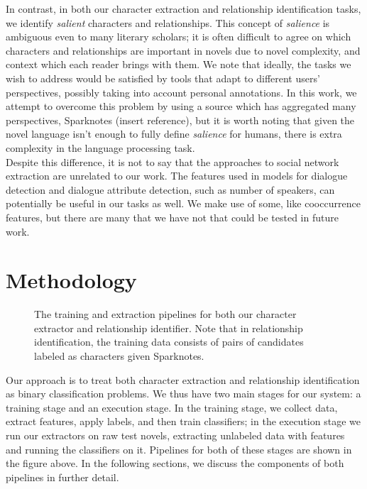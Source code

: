 \documentclass[12pt]{article}
\begin{document}
    In contrast, in both our character extraction and relationship identification tasks, we identify
    \emph{salient} characters and relationships. This concept of \emph{salience} is ambiguous even
    to many literary scholars; it is often difficult to agree on which characters and relationships
    are important in novels due to novel complexity, and context which each reader brings with them.
    We note that ideally, the tasks we wish to address would be satisfied by tools that adapt to
    different users' perspectives, possibly taking into account personal annotations. In this work,
    we attempt to overcome this problem by using a source which has aggregated many perspectives,
    Sparknotes (insert reference), but it is worth noting that given the novel language isn't
    enough to fully define \emph{salience} for humans, there is extra complexity in the language
    processing task. \\

    Despite this difference, it is not to say that the approaches to social network extraction are
    unrelated to our work. The features used in models for dialogue detection and dialogue attribute
    detection, such as number of speakers, can potentially be useful in our tasks as well. We make use
    of some, like cooccurrence features, but there are many that we have not that could be tested
    in future work.

\section{Methodology}
\begin{figure}[H]
    \centering
    \caption{The training and extraction pipelines for both our character extractor and relationship identifier.
        Note that in relationship identification, the training data consists of pairs of candidates labeled as
    characters given Sparknotes.}
\end{figure}

Our approach is to treat both character extraction and relationship identification as binary classification problems. 
We thus have two main stages for our system: a training stage and an execution stage. 
In the training stage, we collect data, extract features, apply labels, and then train classifiers; 
in the execution stage we run our extractors on raw test novels, extracting unlabeled data with features 
and running the classifiers on it. Pipelines for both of these stages are shown in the figure above. 
In the following sections, we discuss the components of both pipelines in further detail.\\
\end{document}
